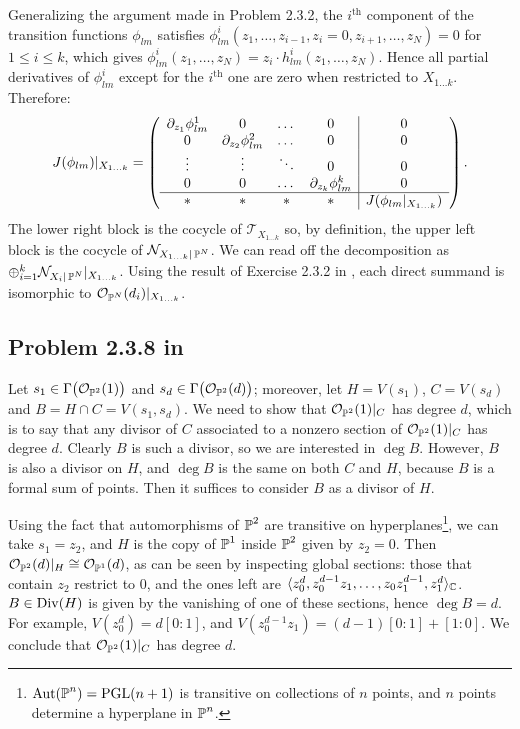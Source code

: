 \documentclass{article}
\begin{document}
Generalizing the argument made in Problem 2.3.2, the $i^{\text{th}}$ component of the transition functions $\phi_{lm}$
satisfies $\phi_{lm}^i(z_1, \dots, z_{i-1}, z_i = 0, z_{i+1}, \dots, z_{N}) = 0$ for $1\leq i \leq k$, which gives
$\phi_{lm}^i(z_1, \dots, z_{N}) = z_i \cdot h^i_{lm}(z_1, \dots, z_{N})$. Hence all partial derivatives
of $\phi_{lm}^i$ except for the $i^{\text{th}}$ one are zero when restricted to $X_{1\dots k}$. Therefore:
\[	
J(\phi_{lm})|_{X_{1\dots k}} = \left( \begin{array} {cccc|c} 
\partial_{z_1}\phi_{lm}^1 & 0 & \dots & 0 & 0 \\
0 & \partial_{z_2}\phi_{lm}^2 & \dots & 0 & 0 \\
\vdots & \vdots & \ddots & 0 & 0 \\
0 & 0 & \dots & \partial_{z_k}\phi_{lm}^k & 0 \\ \hline
* & * & * & * & J(\phi_{lm}|_{X_{1\dots k}})
\end{array} \right)	.
\]
The lower right block is the cocycle of $\mathcal{T}_{X_{1\dots k}}$ so, by definition, the upper left block 
is the cocycle of $\mathcal{N}_{X_{1\dots k}|\operatorname{\mathbb{P}}^N}$. We can read off the decomposition
as $\oplus_{i=1}^k \mathcal{N}_{X_{i}|\operatorname{\mathbb{P}}^N}|_{X_{1\dots k}}$. Using the result of Exercise 2.3.2 in \cite{Huy}
, each direct
summand is isomorphic to $\mathcal{O}_{\operatorname{\mathbb{P}}^N}(d_i)|_{X_{1\dots k}}$.




\subsection*{Problem 2.3.8 in \cite{Huy}}
Let $s_1 \in \Gamma\big(\mathcal{O}_{\operatorname{\mathbb{P}}^2}(1)\big)$ and $s_d \in \Gamma\big(\mathcal{O}_{\operatorname{\mathbb{P}}^2}(d)\big)$; moreover,
let $H = V(s_1)$, $C = V(s_d)$ and $B = H \cap C = V(s_1, s_d)$. We need to show that $\mathcal{O}_{\operatorname{\mathbb{P}}^2}(1)|_C$
has degree $d$, which is to say that any divisor of $C$ associated to a nonzero section of $\mathcal{O}_{\operatorname{\mathbb{P}}^2}(1)|_C$ 
has degree $d$. Clearly $B$ is such a divisor, so we are interested in $\deg B$. However, $B$ is also a 
divisor on $H$, and
$\deg B$ is the same on both $C$ and $H$, because $B$ is a formal sum of points. Then it suffices to consider
$B$ as a divisor of $H$.

Using the fact that automorphisms of $\operatorname{\mathbb{P}}^2$ are transitive on hyperplanes\footnote{$\operatorname{Aut}(\operatorname{\mathbb{P}}^n) = \operatorname{PGL}(n+1)$ 
is transitive
on collections of $n$ points, and $n$ points determine a hyperplane in $\operatorname{\mathbb{P}}^n$.}, we can take $s_1 = z_2$, and $H$
is the copy of $\operatorname{\mathbb{P}}^1$ inside $\operatorname{\mathbb{P}}^2$ given by $z_2 = 0$. Then $\mathcal{O}_{\operatorname{\mathbb{P}}^2}(d)|_H \cong \mathcal{O}_{\operatorname{\mathbb{P}}^1}
(d)$, as can be seen by inspecting global sections: those that contain $z_2$ restrict to $0$, and the ones left are
$\langle z_0^d, z_0^{d-1}z_1, \dots, z_0 z_1^{d-1}, z_1^d \rangle_{\mathbb{C}}$. $B \in \operatorname{Div}(H)$ is given by the vanishing
of one of these sections, hence $\deg B = d$. For example, $V(z_0^d) = d [0:1]$, and $V(z_0^{d-1}z_1) = (d-1)[0:1]
+ [1:0]$. We conclude that $\mathcal{O}_{\operatorname{\mathbb{P}}^2}(1)|_C$ has degree $d$.
\end{document}
